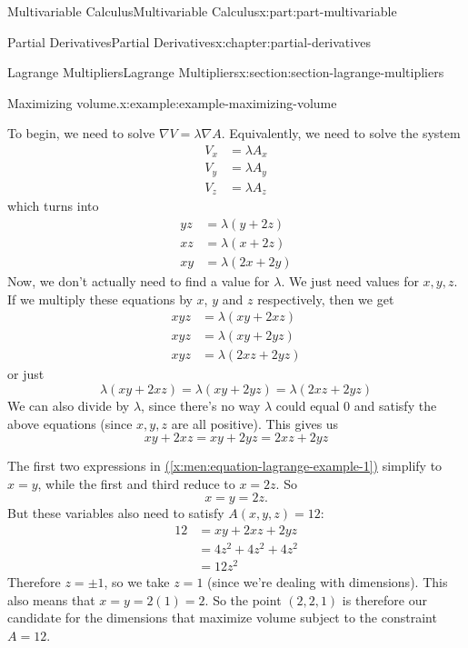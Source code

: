 \documentclass[twoside,10pt,]{tufte-book}
\newcommand{\xreffont}{\relax}
\numberwithin{equation}{part}
\newcommand{\grad}{\nabla}
\begin{document}
\begin{partptx}{Multivariable Calculus}{}{Multivariable Calculus}{}{}{x:part:part-multivariable}
\begin{chapterptx}{Partial Derivatives}{}{Partial Derivatives}{}{}{x:chapter:partial-derivatives}
\begin{sectionptx}{Lagrange Multipliers}{}{Lagrange Multipliers}{}{}{x:section:section-lagrange-multipliers}
\begin{example}{Maximizing volume.}{x:example:example-maximizing-volume}
\par
To begin, we need to solve \(\grad V = \lambda \grad A\). Equivalently, we need to solve the system%
\begin{align*}
V_{x} & = \lambda A_{x} \\
V_{y} & = \lambda A_{y} \\
V_{z} & = \lambda A_{z} 
\end{align*}
which turns into%
\begin{align*}
yz & = \lambda(y + 2z) \\
xz & = \lambda(x + 2z) \\
xy & = \lambda(2x + 2y) 
\end{align*}
Now, we don't actually need to find a value for \(\lambda\). We just need values for \(x,y,z\). If we multiply these equations by \(x\), \(y\) and \(z\) respectively, then we get%
\begin{align*}
xyz & = \lambda(xy + 2xz) \\
xyz & = \lambda(xy + 2yz) \\
xyz & = \lambda(2xz + 2yz) 
\end{align*}
or just%
\begin{equation*}
\lambda(xy + 2xz) = \lambda(xy + 2yz) = \lambda(2xz + 2yz)
\end{equation*}
We can also divide by \(\lambda\), since there's no way \(\lambda\) could equal \(0\) and satisfy the above equations (since \(x,y,z\) are all positive). This gives us%
\begin{equation}
xy + 2xz = xy + 2yz = 2xz + 2yz\label{x:men:equation-lagrange-example-1}
\end{equation}
%
\par
The first two expressions in \hyperref[x:men:equation-lagrange-example-1]{({\xreffont\ref{x:men:equation-lagrange-example-1}})} simplify to \(x=y\), while the first and third reduce to \(x = 2z\). So%
\begin{equation*}
x = y = 2z\text{.}
\end{equation*}
But these variables also need to satisfy \(A(x,y,z) = 12\):%
\begin{align*}
12 & = xy + 2xz + 2yz \\
& = 4z^{2} + 4z^{2} + 4z^{2} \\
& = 12z^{2} 
\end{align*}
Therefore \(z = \pm1\), so we take \(z=1\) (since we're dealing with dimensions). This also means that \(x = y = 2(1) = 2\). So the point \((2,2,1)\) is therefore our candidate for the dimensions that maximize volume subject to the constraint \(A = 12\).%

\end{example}
\end{sectionptx}
\end{chapterptx}
\end{partptx}
\end{document}

